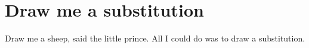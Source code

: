
\section{Draw me a substitution}\label{sec:draw_substitution}

Draw me a sheep, said the little prince. All I could do was to draw a substitution.
